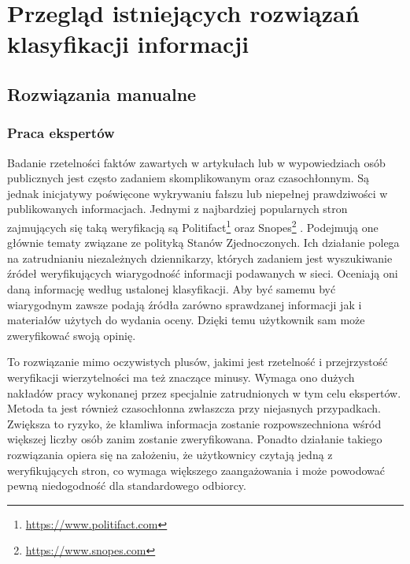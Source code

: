 \newpage %
\section{Przegląd istniejących rozwiązań klasyfikacji informacji}
\subsection{Rozwiązania manualne}
\subsubsection{Praca ekspertów}
Badanie rzetelności faktów zawartych w artykułach lub w wypowiedziach osób publicznych jest często zadaniem skomplikowanym oraz czasochłonnym. Są jednak inicjatywy poświęcone wykrywaniu fałszu lub niepełnej prawdziwości w publikowanych informacjach. Jednymi z najbardziej popularnych stron zajmujących się taką weryfikacją są Politifact\footnote{\url{https://www.politifact.com}} oraz Snopes\footnote{\url{https://www.snopes.com}} . Podejmują one głównie tematy związane ze polityką Stanów Zjednoczonych.  Ich działanie polega na zatrudnianiu niezależnych dziennikarzy, których zadaniem jest wyszukiwanie źródeł weryfikujących wiarygodność informacji podawanych w sieci. Oceniają oni daną informację według ustalonej klasyfikacji. Aby być samemu być wiarygodnym zawsze podają źródła zarówno sprawdzanej informacji jak i materiałów użytych do wydania oceny. Dzięki temu użytkownik sam może zweryfikować swoją opinię. 
\par To rozwiązanie mimo oczywistych plusów, jakimi jest rzetelność i przejrzystość weryfikacji wierzytelności ma też znaczące minusy. Wymaga ono dużych nakładów pracy wykonanej przez specjalnie zatrudnionych w tym celu ekspertów. Metoda ta jest również czasochłonna zwłaszcza przy niejasnych przypadkach. Zwiększa to ryzyko, że kłamliwa informacja zostanie rozpowszechniona wśród większej liczby osób zanim zostanie zweryfikowana. Ponadto działanie takiego rozwiązania opiera się na założeniu, że użytkownicy czytają jedną z weryfikujących stron, co wymaga większego zaangażowania i może powodować pewną niedogodność dla standardowego odbiorcy. 
